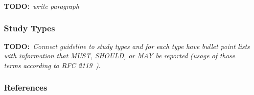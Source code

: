 \documentclass[11pt]{article}
\newcommand{\todo}[1]{{\textbf{TODO:}\ \textit{#1}}} %
\begin{document}
\todo{write paragraph}


\subsubsection{Study Types}

\todo{Connect guideline to study types and for each type have bullet point lists with information that MUST, SHOULD, or MAY be reported (usage of those terms according to RFC 2119~\cite{rfc2119}).}


\subsubsection{References}



\end{document}
